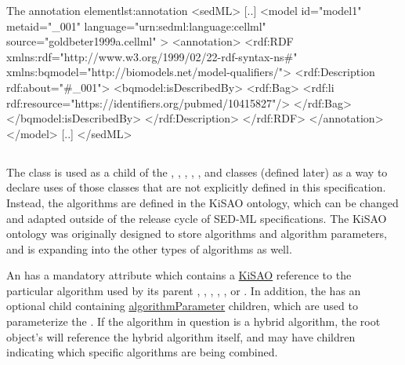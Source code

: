 \begin{myXmlLst}{The annotation element}{lst:annotation}
<sedML>
	[..]
	<model id="model1" metaid="_001" language="urn:sedml:language:cellml" source="goldbeter1999a.cellml" >
		<annotation>
    		<rdf:RDF xmlns:rdf="http://www.w3.org/1999/02/22-rdf-syntax-ns#" xmlns:bqmodel="http://biomodels.net/model-qualifiers/">
				<rdf:Description rdf:about="#_001">
				<bqmodel:isDescribedBy>
				<rdf:Bag>
					<rdf:li rdf:resource="https://identifiers.org/pubmed/10415827"/>
				</rdf:Bag>
				</bqmodel:isDescribedBy>
    			</rdf:Description>
			</rdf:RDF>
		</annotation>
	</model>
	[..]
</sedML>
\end{myXmlLst}


\subsection{}
\label{class:algorithm}
The  class is used as a child of the \Simulation, \AbstractTask, \Change, \Output, \Range, and \FitExperiment classes (defined later) as a way to declare uses of those classes that are not explicitly defined in this specification.  Instead, the algorithms are defined in the KiSAO ontology, which can be changed and adapted outside of the release cycle of SED-ML specifications.  The KiSAO ontology was originally designed to store \Simulation algorithms and algorithm parameters, and is expanding into the other types of algorithms as well.

An \Algorithm has a mandatory attribute  which contains a \hyperref[sec:kisao]{KiSAO} reference to the particular algorithm used by its parent \Simulation, \AbstractTask, \Change, \Output, \Range, or \FitExperiment. In addition, the \Algorithm has an optional \hyperref[class:listOfAlgorithmParameters]{} child containing \hyperref[class:algorithmParameter]{algorithmParameter} children, which are used to parameterize the .  If the algorithm in question is a hybrid algorithm, the root \Algorithm object's  will reference the hybrid algorithm itself, and may have \AlgorithmParameter children indicating which specific algorithms are being combined.


